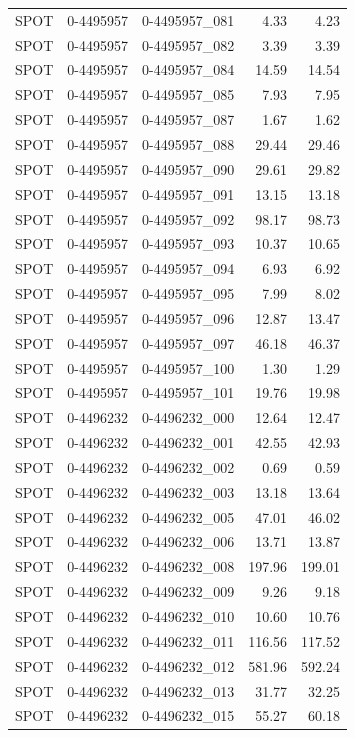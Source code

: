 \begin{tabular}{lllrr}
SPOT & 0-4495957 & 0-4495957_081 & 4.33 & 4.23 \\
SPOT & 0-4495957 & 0-4495957_082 & 3.39 & 3.39 \\
SPOT & 0-4495957 & 0-4495957_084 & 14.59 & 14.54 \\
SPOT & 0-4495957 & 0-4495957_085 & 7.93 & 7.95 \\
SPOT & 0-4495957 & 0-4495957_087 & 1.67 & 1.62 \\
SPOT & 0-4495957 & 0-4495957_088 & 29.44 & 29.46 \\
SPOT & 0-4495957 & 0-4495957_090 & 29.61 & 29.82 \\
SPOT & 0-4495957 & 0-4495957_091 & 13.15 & 13.18 \\
SPOT & 0-4495957 & 0-4495957_092 & 98.17 & 98.73 \\
SPOT & 0-4495957 & 0-4495957_093 & 10.37 & 10.65 \\
SPOT & 0-4495957 & 0-4495957_094 & 6.93 & 6.92 \\
SPOT & 0-4495957 & 0-4495957_095 & 7.99 & 8.02 \\
SPOT & 0-4495957 & 0-4495957_096 & 12.87 & 13.47 \\
SPOT & 0-4495957 & 0-4495957_097 & 46.18 & 46.37 \\
SPOT & 0-4495957 & 0-4495957_100 & 1.30 & 1.29 \\
SPOT & 0-4495957 & 0-4495957_101 & 19.76 & 19.98 \\
SPOT & 0-4496232 & 0-4496232_000 & 12.64 & 12.47 \\
SPOT & 0-4496232 & 0-4496232_001 & 42.55 & 42.93 \\
SPOT & 0-4496232 & 0-4496232_002 & 0.69 & 0.59 \\
SPOT & 0-4496232 & 0-4496232_003 & 13.18 & 13.64 \\
SPOT & 0-4496232 & 0-4496232_005 & 47.01 & 46.02 \\
SPOT & 0-4496232 & 0-4496232_006 & 13.71 & 13.87 \\
SPOT & 0-4496232 & 0-4496232_008 & 197.96 & 199.01 \\
SPOT & 0-4496232 & 0-4496232_009 & 9.26 & 9.18 \\
SPOT & 0-4496232 & 0-4496232_010 & 10.60 & 10.76 \\
SPOT & 0-4496232 & 0-4496232_011 & 116.56 & 117.52 \\
SPOT & 0-4496232 & 0-4496232_012 & 581.96 & 592.24 \\
SPOT & 0-4496232 & 0-4496232_013 & 31.77 & 32.25 \\
SPOT & 0-4496232 & 0-4496232_015 & 55.27 & 60.18 \\

\end{tabular}
